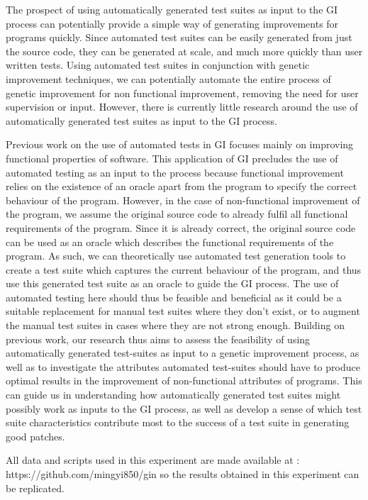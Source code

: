 \documentclass[titlepage]{article}
\begin{document}
The prospect of using automatically generated test suites as input to the GI process can potentially provide a simple way of generating improvements for programs quickly. Since automated test suites can be easily generated from just the source code, they can be generated at scale, and much more quickly than user written tests. Using automated test suites in conjunction with genetic improvement techniques, we can potentially automate the entire process of genetic improvement for non functional improvement, removing the need for user supervision or input. However, there is currently little research around the use of automatically generated test suites as input to the GI process.

Previous work on the use of automated tests in GI focuses mainly on improving functional properties of software. This application of GI precludes the use of automated testing as an input to the process because functional improvement relies on the existence of an oracle apart from the program to specify the correct behaviour of the program. However, in the case of non-functional improvement of the program, we assume the original source code to already fulfil all functional requirements of the program. Since it is already correct, the original source code can be used as an oracle which describes the functional requirements of the program. \cite{petkegin} As such, we can theoretically use automated test generation tools to create a test suite which captures the current behaviour of the program, and thus use this generated test suite as an oracle to guide the GI process. The use of automated testing here should thus be feasible and beneficial as it could be a suitable replacement for manual test suites where they don’t exist, or to augment the manual test suites in cases where they are not strong enough.
Building on previous work, our research thus aims to assess the feasibility of using automatically generated test-suites as input to a genetic improvement process, as well as to investigate the attributes automated test-suites should have to produce optimal results in the improvement of non-functional attributes of programs. This can guide us in understanding how automatically generated test suites might possibly work as inputs to the GI process, as well as develop a sense of which test suite characteristics contribute most to the success of a test suite in generating good patches.

All data and scripts used in this experiment are made available at : https://github.com/mingyi850/gin so the results obtained in this experiment can be replicated.
\end{document}
